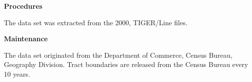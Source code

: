 {\bf \large Procedures}

The data set was extracted from the 2000, TIGER/Line files.

{\bf \large Maintenance}

The data set originated from the Department of Commerce, Census
Bureau, Geography Division. Tract boundaries are released from the
Census Bureau every 10 years.

\begin{landscape}
\begin{longtable}{llrrrrrc}

\end{longtable}
\end{landscape}
\newpage

